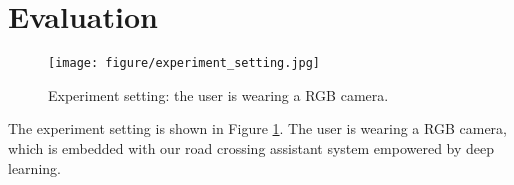 \section{Evaluation}
\begin{figure}[t]
	\begin{center}
		\texttt{[image: figure/experiment\_setting.jpg]}
	\end{center}
	\caption{Experiment setting: the user is wearing a RGB camera.}
	\label{fig:expset}
\end{figure}

The experiment setting is shown in Figure \ref*{fig:expset}. The user is wearing a RGB camera, which is embedded with our road crossing assistant system empowered by deep learning.

\para{}